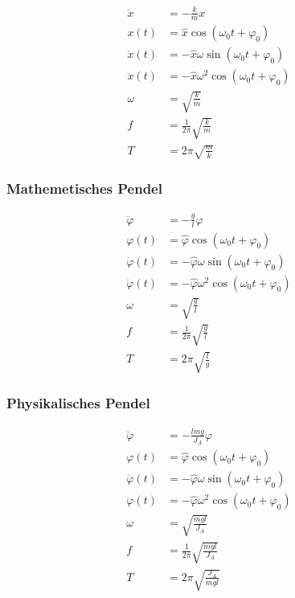 \begin{align*}
\ddot{x}&=-\frac{k}{m}x\\
x(t)&=\hat{x}\cos(\omega_0 t+\varphi_0)\\
\dot{x}(t)&=-\hat{x}\omega\sin(\omega_0 t+\varphi_0)\\
\ddot{x}(t)&=-\hat{x}\omega^2\cos(\omega_0 t+\varphi_0)\\
\omega&=\sqrt{\frac{k}{m}}\\
f&=\frac{1}{2\pi}\sqrt{\frac{k}{m}}\\
T&=2\pi\sqrt{\frac{m}{k}}
\end{align*}

\newpage
\begin{multicols}{2}{}
\subsubsection{Mathemetisches Pendel}
\begin{align*}
\ddot{\varphi}&=-\frac{g}{l}\varphi\\
\varphi(t)&=\hat{\varphi}\cos(\omega_0 t+\varphi_0)\\
\dot{\varphi}(t)&=-\hat{\varphi}\omega\sin(\omega_0 t+\varphi_0)\\
\ddot{\varphi}(t)&=-\hat{\varphi}\omega^2\cos(\omega_0 t+\varphi_0)\\
\omega&=\sqrt{\frac{g}{l}}\\
f&=\frac{1}{2\pi}\sqrt{\frac{g}{l}}\\
T&=2\pi\sqrt{\frac{l}{g}}
\end{align*}

\subsubsection{Physikalisches Pendel}
\begin{align*}
\ddot{\varphi}&=-\frac{lmg}{J_A}\varphi\\
\varphi(t)&=\hat{\varphi}\cos(\omega_0 t+\varphi_0)\\
\dot{\varphi}(t)&=-\hat{\varphi}\omega\sin(\omega_0 t+\varphi_0)\\
\ddot{\varphi}(t)&=-\hat{\varphi}\omega^2\cos(\omega_0 t+\varphi_0)\\
\omega&=\sqrt{\frac{mgl}{J_A}}\\
f&=\frac{1}{2\pi}\sqrt{\frac{mgl}{J_A}}\\
T&=2\pi\sqrt{\frac{J_A}{mgl}}
\end{align*}
\end{multicols}

